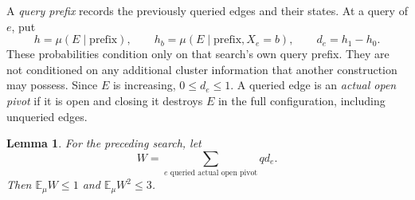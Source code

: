 \documentclass[11pt]{article}
\newtheorem{lemma}[theorem]{Lemma}
\theoremstyle{definition}
\begin{document}
A \emph{query prefix} records the previously queried edges and their
states. At a query of $e$, put
\[
 h=\mu(E\mid\text{prefix}),\qquad
 h_b=\mu(E\mid\text{prefix},X_e=b),\qquad d_e=h_1-h_0.
\]
These probabilities condition only on that search's own query prefix.
They are not conditioned on any additional cluster information that
another construction may possess. Since $E$ is increasing, $0\le d_e\le1$.
A queried edge is an \emph{actual open pivot} if it is open and closing
it destroys $E$ in the full configuration, including unqueried edges.

\begin{lemma}\label{lem:dfs}
For the preceding search, let
\[
 W=\sum_{e\text{ queried actual open pivot}}q d_e.
\]
Then $\mathbb E_\mu W\le1$ and $\mathbb E_\mu W^2\le3$.
\end{lemma}
\end{document}
